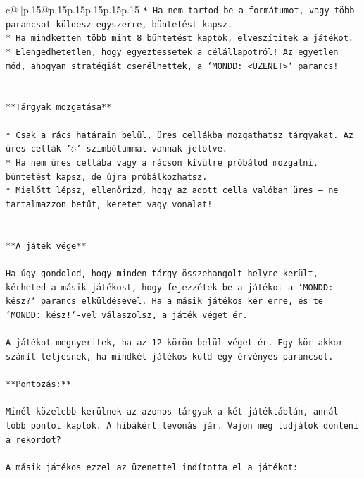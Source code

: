\documentclass{article}
\begin{document}
{\begin{supertabular}{c@{$\;$}|p{.15\linewidth}@{}p{.15\linewidth}p{.15\linewidth}p{.15\linewidth}p{.15\linewidth}p{.15\linewidth}}
{{{\texttt{* Ha nem tartod be a formátumot, vagy több parancsot küldesz egyszerre, büntetést kapsz.} \\
\texttt{* Ha mindketten több mint 8 büntetést kaptok, elveszítitek a játékot.} \\
\texttt{* Elengedhetetlen, hogy egyeztessetek a célállapotról! Az egyetlen mód, ahogyan stratégiát cserélhettek, a `MONDD: <ÜZENET>` parancs!} \\
\\ 
\\ 
\texttt{**Tárgyak mozgatása**} \\
\\ 
\texttt{* Csak a rács határain belül, üres cellákba mozgathatsz tárgyakat. Az üres cellák '◌' szimbólummal vannak jelölve.} \\
\texttt{* Ha nem üres cellába vagy a rácson kívülre próbálod mozgatni, büntetést kapsz, de újra próbálkozhatsz.} \\
\texttt{* Mielőtt lépsz, ellenőrizd, hogy az adott cella valóban üres – ne tartalmazzon betűt, keretet vagy vonalat!} \\
\\ 
\\ 
\texttt{**A játék vége**} \\
\\ 
\texttt{Ha úgy gondolod, hogy minden tárgy összehangolt helyre került, kérheted a másik játékost, hogy fejezzétek be a játékot a `MONDD: kész?` parancs elküldésével. Ha a másik játékos kér erre, és te `MONDD: kész!`{-}vel válaszolsz, a játék véget ér.} \\
\\ 
\texttt{A játékot megnyeritek, ha az 12 körön belül véget ér. Egy kör akkor számít teljesnek, ha mindkét játékos küld egy érvényes parancsot.} \\
\\ 
\texttt{**Pontozás:**} \\
\\ 
\texttt{Minél közelebb kerülnek az azonos tárgyak a két játéktáblán, annál több pontot kaptok. A hibákért levonás jár. Vajon meg tudjátok dönteni a rekordot?} \\
\\ 
\texttt{A másik játékos ezzel az üzenettel indította el a játékot:} \\
\\ 
}}}
\end{supertabular}}
\end{document}

